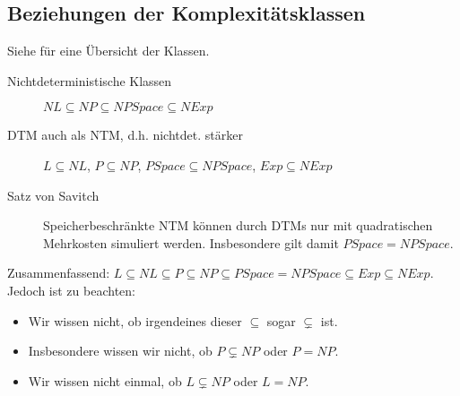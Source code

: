 \subsection{Beziehungen der Komplexitätsklassen}
    Siehe  für eine Übersicht der Klassen. 
    \begin{description}
        \item[Nichtdeterministische Klassen] $NL \subseteq NP \subseteq NPSpace \subseteq NExp$
        \item[DTM auch als NTM, d.h. nichtdet. stärker] $L \subseteq NL$, $P \subseteq NP$, $\mathit{PSpace} \subseteq \mathit{NPSpace}$, $Exp \subseteq NExp$
        \item[Satz von Savitch] Speicherbeschränkte NTM können durch DTMs nur mit  quadratischen Mehrkosten simuliert werden. Insbesondere gilt damit $\mathit{PSpace} = \mathit{NPSpace}$.
    \end{description}

    Zusammenfassend: $L \subseteq NL \subseteq P \subseteq NP \subseteq \mathit{PSpace} = \mathit{NPSpace} \subseteq Exp \subseteq NExp$. \\
    Jedoch ist zu beachten:

    \begin{itemize}
        \setlength\itemsep{0em}
        \item Wir wissen nicht, ob irgendeines dieser $\subseteq$ sogar $\subsetneq$ ist.
        \item Insbesondere wissen wir nicht, ob $P \subsetneq NP$ oder $P = NP$.
        \item Wir wissen nicht einmal, ob $L \subsetneq NP$ oder $L = NP$.
    \end{itemize}
